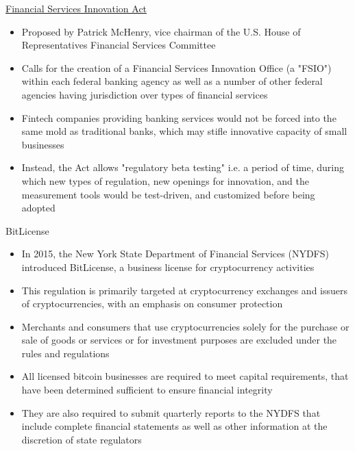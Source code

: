 \documentclass[9pt]{beamer}
\begin{document}
\begin{frame}{\href{https://www.congress.gov/bill/114th-congress/house-bill/6118/text}{Financial Services Innovation Act}}
	\begin{itemize}
		\item Proposed by Patrick McHenry, vice chairman of the U.S. House of Representatives Financial Services Committee
		\item Calls for the creation of a Financial Services Innovation Office (a "FSIO") within each federal banking agency as well as a number of other federal agencies having jurisdiction over types of financial services
		\item Fintech companies providing banking services would not be forced into the same mold as traditional banks, which may stifle innovative capacity of small businesses
		\item Instead, the Act allows "regulatory beta testing" i.e. a period of time, during which new types of regulation, new openings for innovation, and the measurement tools would be test-driven, and customized before being adopted
	\end{itemize}
\end{frame}


\begin{frame}{BitLicense}
	\begin{itemize}
		\item In 2015, the New York State Department of Financial Services (NYDFS) introduced BitLicense, a business license for cryptocurrency activities
		\item This regulation is primarily targeted at cryptocurrency exchanges and issuers of cryptocurrencies, with an emphasis on consumer protection
		\item Merchants and consumers that use cryptocurrencies solely for the purchase or sale of goods or services or for investment purposes are excluded under the rules and regulations
		\item All licensed bitcoin businesses are required to meet capital requirements, that have been determined sufficient to ensure financial integrity
		\item They are also required to submit quarterly reports to the NYDFS that include complete financial statements as well as other information at the discretion of state regulators
	\end{itemize}
\end{frame}
\end{document}
